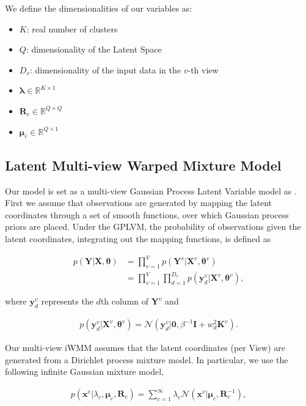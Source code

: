 \documentclass[]{article}
\newcommand{\gD}[2]{\mathcal{N}\left(#1,#2\right)}
\newcommand{\eye}{\mathbf{I}}
\newcommand{\setYv}{\mathbf{Y}^{v}}
\newcommand{\setY}{\mathbf{Y}}
\newcommand{\setXv}{\mathbf{X}^{v}}
\newcommand{\setKv}{\mathbf{K}^{v}}
\newcommand{\setX}{\mathbf{X}}
\newcommand{\hParams}{\boldsymbol{\theta}}
\newcommand{\hParamsv}{\boldsymbol{\theta}^{v}}
\newcommand{\lambdac}{\lambda_c}
\newcommand{\muC}{\boldsymbol{\mu}_c}
\newcommand{\RC}{\mathbf{R}_c}
\begin{document}
We define the dimensionalities of our variables as:

\begin{itemize}
	\item 	$K$: real number of clusters
	\item $Q$:  dimensionality of the Latent Space
	\item $D_v$: dimensionality of the input data in the $v$-th view 
	\item $\boldsymbol{\lambda} \in \mathbb{R}^{K\times 1}$ 
	\item $\mathbf{R}_c \in \mathbb{R}^{Q\times Q}$
	\item $\boldsymbol{\mu}_c \in \mathbb{R}^{Q\times 1}$
\end{itemize}


\subsection{Latent Multi-view Warped Mixture Model}

Our model is set as a multi-view Gaussian Process Latent Variable model as \cite{Lawrence03}. First we assume 
that observations are generated by mapping the latent coordinates through a set of smooth functions, over
which Gaussian process priors are placed. Under the GPLVM, the probability of observations given the latent
coordinates, integrating out the mapping functions, is defined as

\begin{align}
p\left(\setY|\setX,\hParams\right) &= \prod_{v=1}^{V}p\left(\setYv|\setXv,\hParamsv\right) \\
   &= \prod_{v=1}^{V}\prod_{d=1}^{D_v}p\left(\mathbf{y}_d^v|\setXv,\hParamsv\right),
\end{align}


where $\mathbf{y}_d^v$ represents the $d$th column of $\setYv$ and

\begin{align}
p\left(\mathbf{y}_d^v|\setXv,\hParamsv\right) = \gD{\mathbf{y}_d^v|\mathbf{0}}{\beta^{-1}\eye + w_d^2\setKv}.
\end{align}

Our multi-view iWMM assumes that the latent coordinates (per View) are generated from a Dirichlet process mixture model. In particular, we use the following infinite Gaussian mixture model,

\begin{align}
p(\mathbf{x}^{v}|\lambdac,\muC,\RC) = \sum_{c=1}^{\infty}\lambdac \gD{\mathbf{x}^{v}|\muC}{\RC^{-1}},
\end{align}
\end{document}

